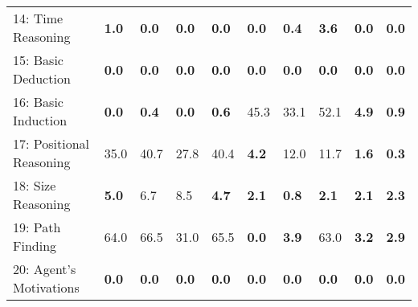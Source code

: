 \documentclass{article} \usepackage{iclr2018_conference,times}
\begin{document}
\begin{table}[t]
\begin{adjustbox}{max width=\textwidth}
\begin{tabular}{l|lllllllll}
14: Time Reasoning                   & \textbf{1.0}                       &\textbf{0.0}                        & \textbf{0.0}                         &\textbf {0.0}                     & \textbf{0.0}                      & \textbf{0.4} & \textbf{3.6}                      &\textbf{0.0}                    & \textbf{0.0}                    \\
15: Basic Deduction                  & \textbf{0.0}                       & \textbf{0.0}                        &\textbf{0.0}                         & \textbf{0.0}                    &\textbf{0.0}                    & \textbf{0.0}                     &\textbf{0.0}                        & \textbf{0.0}                   &\textbf{0.0}                     \\
16: Basic Induction                  &\textbf{0.0}                       & \textbf{0.4}                        & \textbf{0.0}                         & \textbf{0.6}                   & 45.3                     & 33.1                    & 52.1                       & \textbf{4.9}                   & \textbf{0.9}                    \\
17: Positional Reasoning             & 35.0                        & 40.7                       & 27.8                        & 40.4                    & \textbf{4.2}                      & 12.0                    & 11.7                       & \textbf{1.6}                    & \textbf{0.3} \\
18: Size Reasoning                   & \textbf{5.0}                      & 6.7                        & 8.5                         & \textbf{4.7}                     & \textbf{2.1}                     & \textbf{0.8}                     & \textbf{2.1}                        & \textbf{2.1}                    & \textbf{2.3}                     \\
19: Path Finding                     & 64.0                      & 66.5                       & 31.0                        & 65.5                    & \textbf{0.0}                      & \textbf{3.9}                     & 63.0                       & \textbf{3.2}                    & \textbf{2.9}                     \\
20: Agent's Motivations              & \textbf{0.0}                       & \textbf{0.0}                        & \textbf{0.0} & \textbf{0.0}                    &\textbf{ 0.0}                      & \textbf{0.0}                     & \textbf{0.0}                        &\textbf{0.0}                    & \textbf{0.0}                     \\ \hline

\end{tabular}
\end{adjustbox}
\end{table}
\end{document}
